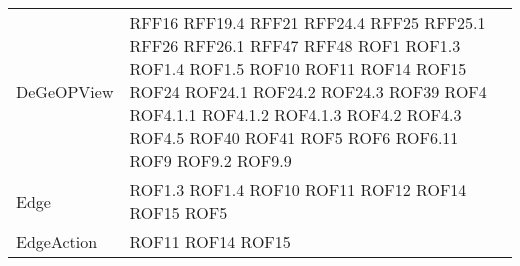 \begin{longtable}{p{5cm}!{\VRule[1pt]}p{2.5cm}}
	DeGeOPView & RFF16 \newline RFF19.4 \newline RFF21 \newline RFF24.4 \newline RFF25 \newline RFF25.1 \newline RFF26 \newline RFF26.1 \newline RFF47 \newline RFF48 \newline ROF1 \newline ROF1.3 \newline ROF1.4 \newline ROF1.5 \newline ROF10 \newline ROF11 \newline ROF14 \newline ROF15 \newline ROF24 \newline ROF24.1 \newline ROF24.2 \newline ROF24.3 \newline ROF39 \newline ROF4 \newline ROF4.1.1 \newline ROF4.1.2 \newline ROF4.1.3 \newline ROF4.2 \newline ROF4.3 \newline ROF4.5 \newline ROF40 \newline ROF41 \newline ROF5 \newline ROF6 \newline ROF6.11 \newline ROF9 \newline ROF9.2 \newline ROF9.9\\
	Edge & ROF1.3 \newline ROF1.4 \newline ROF10 \newline ROF11 \newline ROF12 \newline ROF14 \newline ROF15 \newline ROF5\\
	EdgeAction & ROF11 \newline ROF14 \newline ROF15\\

\end{longtable}
